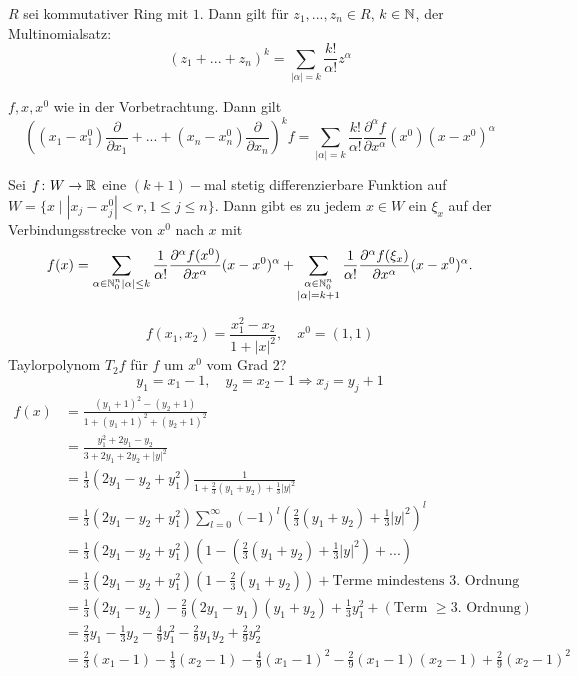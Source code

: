 \begin{lemma}
	$ R $ sei kommutativer Ring mit $ 1 $. Dann gilt f\"ur $ z_1,...,z_n\in R $, $ k\in\mathbb{N} $, der Multinomialsatz:
	\[ (z_1+...+z_n)^k=\sum_{|\alpha|=k}\frac{k!}{\alpha!}z^{\alpha} \]
\end{lemma}
\begin{beispiel*}[Anwendung]
	$ f,x,x^0 $ wie in der Vorbetrachtung. Dann gilt 
	\[ \left((x_1-x_1^0)\frac{\partial}{\partial x_1}+...+(x_n-x_n^0)\frac{\partial}{\partial x_n}\right)^kf=\sum_{|\alpha|=k}^{}\frac{k!}{\alpha!}\frac{\partial^\alpha f}{\partial x^\alpha}(x^0)(x-x^0)^\alpha \]
\end{beispiel*}
\begin{satz}
	Sei $ f\colon W\rightarrow\mathbb{R} $ eine $ (k+1)- $mal stetig differenzierbare Funktion auf $ W=\lbrace x\mid |x_j-x_j^0|<r,1\leq j\leq n\rbrace $. Dann gibt es zu jedem $ x\in W $ ein $ \xi_x $ auf der Verbindungsstrecke von $ x^0 $ nach $ x $ mit
	\[ f(x)=\sum_{\substack{\alpha\in\mathbb{N}^n_0}\\|\alpha|\leq k}^{}\frac{1}{\alpha!}\frac{\partial^\alpha f(x^0)}{\partial x^\alpha}(x-x^0)^\alpha+\sum_{\substack{\alpha\in\mathbb{N}^n_0\\|\alpha|=k+1}}^{}\frac{1}{\alpha!}\frac{\partial^\alpha f(\xi_x)}{\partial x^\alpha}(x-x^0)^\alpha. \] 
\end{satz}
\begin{beispiel*}
	\[ f(x_1,x_2)=\frac{x_1^2-x_2}{1+|x|^2},\quad x^0=(1,1) \]
	Taylorpolynom $ T_2 f $ f\"ur $ f $ um $ x^0 $ vom Grad 2?
	\[ y_1=x_1-1,\quad y_2=x_2-1\Rightarrow x_j=y_j+1\] 
	\begin{align*} f(x)&=\frac{(y_1+1)^2-(y_2+1)}{1+(y_1+1)^2+(y_2+1)^2}\\&=\frac{y_1^2+2y_1-y_2}{3+2y_1+2y_2+|y|^2}\\&=\frac{1}{3}(2y_1-y_2+y_1^2)\frac{1}{1+\frac{2}{3}(y_1+y_2)+\frac{1}{3}|y|^2}\\&=\frac{1}{3}(2y_1-y_2+y_1^2)\sum_{l=0}^{\infty}(-1)^l\left(\frac{2}{3}(y_1+y_2)+\frac{1}{3}|y|^2\right)^l\\&=\frac{1}{3}(2y_1-y_2+y_1^2)\left(1-\left(\frac{2}{3}(y_1+y_2)+\frac{1}{3}|y|^2\right)+...\right)\\&=\frac{1}{3}(2y_1-y_2+y_1^2)\left(1-\frac{2}{3}(y_1+y_2)\right)+\text{Terme mindestens 3. Ordnung}\\&=\frac{1}{3}(2y_1-y_2)-\frac{2}{9}(2y_1-y_1)(y_1+y_2)+\frac{1}{3}y_1^2+(\text{Term }\geq\text{3. Ordnung})\\&
    =\frac{2}{3}y_1-\frac{1}{3}y_2-\frac{4}{9}y_1^2-\frac{2}{9}y_1y_2+\frac{2}{9}y_2^2\\&=\frac{2}{3}(x_1-1)-\frac{1}{3}(x_2-1)-\frac{4}{9}(x_1-1)^2-\frac{2}{9}(x_1-1)(x_2-1)+\frac{2}{9}(x_2-1)^2   
    \end{align*}
\end{beispiel*}
